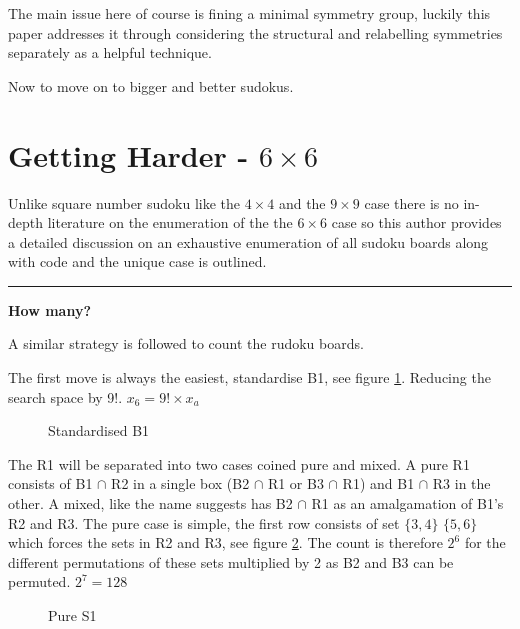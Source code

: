 \documentclass[a4paper,11pt]{report}
\newcounter{row}
\newcounter{col}
\newcommand\setrow[9]{
\setcounter{col}{1}
\foreach \n in {#1, #2, #3, #4, #5, #6, #7, #8, #9} {
\edef\x{\value{col} - 0.5}
\edef\y{9.5 - \value{row}}
\node[anchor=center] at (\x, \y) {\n};
\stepcounter{col}
}
\stepcounter{row}
}
\begin{document}
The main issue here of course is fining a minimal symmetry group, luckily this paper addresses it \cite{arnold2013minimal} through considering the structural and relabelling symmetries separately as a helpful technique. 

Now to move on to bigger and better sudokus.

\section{Getting Harder - $6 \times 6$}
Unlike square number sudoku like the $4\times4$ and the $9\times 9$ case there is no in-depth literature on the enumeration of the the $6 \times 6 $ case so this author provides a detailed discussion on an exhaustive enumeration of all sudoku boards along with code and the unique case is outlined.

\noindent\rule{4cm}{0.4pt}

\textbf{How many?}

A similar strategy is followed to count the rudoku boards.

The first move is always the easiest, standardise B1, see figure \ref{fig:61}. Reducing the search space by 9!. $x_6=9!\times x_a$

\begin{figure}[h]
\centering
{}
\caption{Standardised B1}
\label{fig:61}
\end{figure}

The R1 will be separated into two cases coined pure and mixed. A pure R1 consists of B1 $\cap$ R2 in a single box (B2 $\cap$ R1 or B3 $\cap$ R1) and B1 $\cap$ R3 in the other. A mixed, like the name suggests has B2 $\cap$ R1 as an amalgamation of B1's R2 and R3. The pure case is simple, the first row consists of set $\{3,4\}$ $\{5,6\}$ which forces the sets in R2 and R3, see figure \ref{fig:62}. The count is therefore $2^6$ for the different permutations of these sets multiplied by 2 as B2 and B3 can be permuted. $2^7=128$

\begin{figure}[h]
\centering
{}
\caption{Pure S1}
\label{fig:62}
\end{figure}
\end{document}
